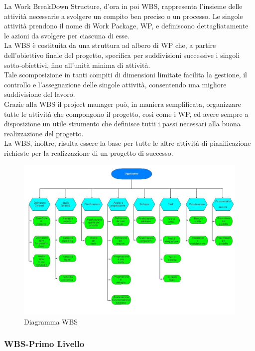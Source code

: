 La Work BreakDown Structure, d'ora in poi WBS, rappresenta l'insieme delle attivit\`{a} necessarie a svolgere un compito ben preciso o un processo. Le singole attivit\`{a} prendono il nome di Work Package, WP, e definiscono dettagliatamente le azioni da svolgere per
ciascuna di esse.\\
La WBS \`{e} costituita da una struttura ad albero di WP che, a partire dell'obiettivo finale del progetto, specifica per suddivisioni successive i singoli sotto-obiettivi, fino all'unit\`{a} minima di attivit\`{a}.\\
Tale scomposizione in tanti compiti di dimensioni limitate facilita la gestione, il controllo e l'assegnazione delle singole attivit\`{a}, consentendo una migliore suddivisione del lavoro.\\
Grazie alla WBS il project manager pu\`{o}, in maniera semplificata, organizzare tutte le attivit\`{a} che compongono il progetto, cos\`{i} come i WP, ed avere sempre a disposizione un utile strumento che definisce tutti i passi necessari alla buona realizzazione del progetto.\\
La WBS, inoltre, risulta essere la base per tutte le altre attivit\`{a} di pianificazione richieste per la realizzazione di un progetto di successo.

\begin{figure}[H]
\centering %
\includegraphics[scale=0.5]{img/Progetto.jpg}
\caption{Diagramma WBS}
\label{fig:Diagramma WBS}
\end{figure}

\subsubsection{WBS-Primo Livello}
